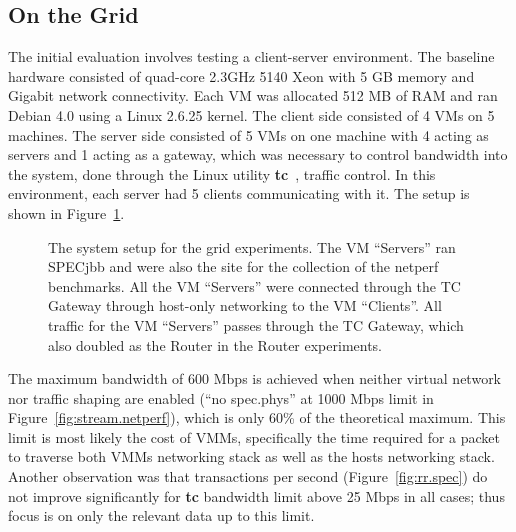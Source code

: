 \subsection{On the Grid}

The initial evaluation involves testing a client-server environment.  The
baseline hardware consisted of quad-core 2.3GHz 5140 Xeon with 5 GB memory and
Gigabit network connectivity.  Each VM was allocated 512 MB of RAM and ran
Debian 4.0 using a Linux 2.6.25 kernel.  The client side consisted of 4 VMs on
5 machines.  The server side consisted of 5 VMs on one machine with 4 acting as
servers and 1 acting as a gateway, which was necessary to control bandwidth
into the system, done through the Linux utility \textbf{tc}~\cite{tc}, traffic
control.  In this environment, each server had 5 clients communicating with it.
The setup is shown in Figure~\ref{fig:gridsetup}.

\begin{figure}
\centering
{}
\caption[Grid evaluation setup]{The system setup for the grid experiments.  The
VM ``Servers'' ran SPECjbb and were also the site for the collection of the
netperf benchmarks.  All the VM ``Servers'' were connected through the TC
Gateway through host-only networking to the VM ``Clients''.  All traffic for
the VM ``Servers'' passes through the TC Gateway, which also doubled as the
Router in the Router experiments.}
\label{fig:gridsetup}
\end{figure}

The maximum bandwidth of 600 Mbps is achieved when neither virtual network nor
traffic shaping are enabled (``no spec.phys'' at 1000 Mbps limit in
Figure~\ref{fig:stream.netperf}), which is only 60\% of the theoretical
maximum.  This limit is most likely the cost of VMMs, specifically the time
required for a packet to traverse both VMMs networking stack as well as the
hosts networking stack.  Another observation was that transactions per second
(Figure~\ref{fig:rr.spec}) do not improve significantly for \textbf{tc}
bandwidth limit above 25 Mbps in all cases; thus focus is on only the relevant
data up to this limit.

